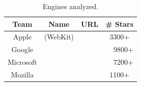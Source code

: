 \documentclass[10pt,conference,anonymous]{IEEEtran}
\begin{document}

\begin{table}[t]
  \centering
  \caption{\label{tab:engines}Engines analyzed.}
  \begin{tabular}{cccr}
    \toprule
    Team & Name & URL & \# Stars \\
    \midrule
    Apple & \jsc{} (WebKit) & \cite{jsc2018repo} & \multicolumn{1}{c}{3300+} \\
    Google & \veight{} & \cite{v82018repo} & 9800+ \\
    Microsoft & \chakra{} & \cite{chakra2018repo} & 7200+ \\
    Mozilla & \smonkey{} & \cite{spidermonkey2018repo} & \multicolumn{1}{c}{1100+} \\
   \bottomrule     
  \end{tabular}
\end{table}
\end{document}
